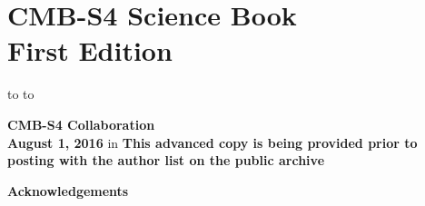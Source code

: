 \documentclass[titlepage]{tcibook}
\begin{document}


\def\bibname{References}

%

\raggedbottom


\parindent=0pt
\parskip=8pt
\setlength{\evensidemargin}{0pt}
\setlength{\oddsidemargin}{0pt}
\setlength{\marginparsep}{0.0in}
\setlength{\marginparwidth}{0.0in}
\marginparpush=0pt


\renewcommand{\chapname}{chap:intro_}
\renewcommand{\chapterdir}{.}
\renewcommand{\arraystretch}{1.25}
\addtolength{\arraycolsep}{-3pt}

\chapter*{CMB-S4 Science Book\\ First Edition}
\vskip -9.5pt
\hbox to
\vskip-6.5pt
\hbox to


  \begin{center}
   {\Large\bf
      CMB-S4 Collaboration\\
      \bigskip
      August 1, 2016
   }
    in
   {\Large\bf
   This advanced copy is being provided prior to posting with the author list on the public archive
   }
 \end{center}
\eject

\setcounter{page}{1}



\begin{center}
  {\Large \bf Acknowledgements}
\end{center}
  
\tableofcontents


\def\as#1{[{\bf AS:} {\it #1}] }


\end{document}
